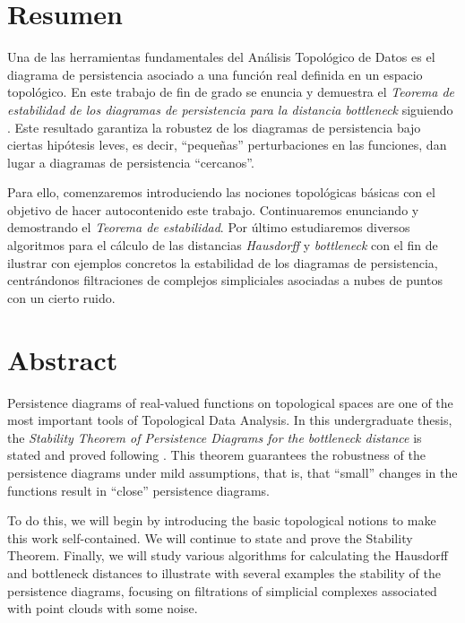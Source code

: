 \chapter*{Resumen}
Una de las herramientas fundamentales del Análisis Topológico de Datos es el diagrama de persistencia asociado a una función real definida en un espacio topológico. En este trabajo de fin de grado se enuncia y demuestra el \emph{Teorema de estabilidad de los diagramas de persistencia para la distancia bottleneck} siguiendo \cite{Cohen-Steiner2007}. Este resultado garantiza la robustez de los diagramas de persistencia bajo ciertas hipótesis leves, es decir, ``pequeñas'' perturbaciones en las funciones, dan lugar a diagramas de persistencia ``cercanos''.  

Para ello, comenzaremos introduciendo las nociones topológicas básicas con el objetivo de hacer autocontenido este trabajo. Continuaremos enunciando y demostrando el \emph{Teorema de estabilidad}. Por último estudiaremos diversos algoritmos para el cálculo de las distancias \emph{Hausdorff} y \emph{bottleneck} con el fin de ilustrar con ejemplos concretos la estabilidad de los diagramas de persistencia, centrándonos filtraciones de complejos simpliciales asociadas a nubes de puntos con un cierto ruido.
\newpage

\chapter*{Abstract}
Persistence diagrams of real-valued functions on topological spaces are one of the most important tools of Topological Data Analysis. In this undergraduate thesis, the \emph{Stability Theorem of Persistence Diagrams for the bottleneck distance} is stated and proved following \cite{Cohen-Steiner2007}. This theorem guarantees the robustness of the persistence diagrams under mild assumptions, that is, that ``small'' changes in the functions result in ``close'' persistence diagrams.

To do this, we will begin by introducing the basic topological notions to make this work self-contained. We will continue to state and prove the Stability Theorem. Finally, we will study various algorithms for calculating the Hausdorff and bottleneck distances to illustrate with several examples the stability of the persistence diagrams, focusing on filtrations of simplicial complexes associated with point clouds with some noise.

